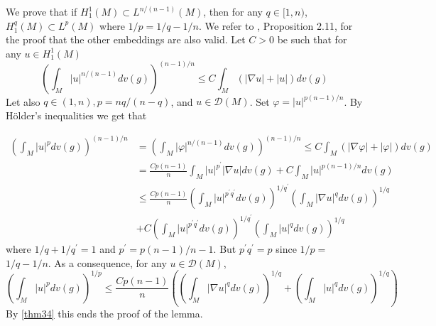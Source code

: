 \documentclass[12pt,hyperref,a4paper,UTF8]{ctexart}
\begin{document}
\begin{Proof}
    We prove that if $H_1^1(M) \subset L^{n /(n-1)}(M)$, then for any $q \in[1, n)$, $H_1^q(M) \subset L^p(M)$ where $1 / p=1 / q-1 / n$. We refer to \cite{Aubin}, Proposition 2.11, for the proof that the other embeddings are also valid. Let $C>0$ be such that for any $u \in H_1^{1}(M)$
$$
\left(\int_M|u|^{n /(n-1)} d v(g)\right)^{(n-1) / n} \leq C \int_M(|\nabla u|+|u|) d v(g)
$$
Let also $q \in(1, n), p=n q /(n-q)$, and $u \in \mathcal{D}(M)$. Set $\varphi=|u|^{p(n-1) / n}$. By Hölder's inequalities we get that

$$
\begin{aligned}
    \left(\int_M|u|^p d v(g)\right)^{(n-1) / n} &=\left(\int_M|\varphi|^{n /(n-1)} d v(g)\right)^{(n-1) / n} \leq C \int_M(|\nabla \varphi|+|\varphi|) d v(g)\\
    &= \frac{C p(n-1)}{n} \int_M|u|^{p^{\prime}}|\nabla u| d v(g)+C \int_M|u|^{p(n-1) / n} d v(g) \\
    &\leq  \frac{C p(n-1)}{n}\left(\int_M|u|^{p^{\prime} q^{\prime}} d v(g)\right)^{1 / q^{\prime}}\left(\int_M|\nabla u|^q d v(g)\right)^{1 / q} \\
    & +C\left(\int_M|u|^{p^{\prime} q^{\prime}} d v(g)\right)^{1 / q^{\prime}}\left(\int_M|u|^q d v(g)\right)^{1 / q}
\end{aligned}
$$
where $1 / q+1 / q^{\prime}=1$ and $p^{\prime}=p(n-1) / n-1$. But $p^{\prime} q^{\prime}=p$ since $1 / p=$ $1 / q-1 / n$. As a consequence, for any $u \in \mathcal{D}(M)$,
$$
\left(\int_M|u|^p d v(g)\right)^{1 / p} \leq \frac{C p(n-1)}{n}\left(\left(\int_M|\nabla u|^q d v(g)\right)^{1 / q}+\left(\int_M|u|^q d v(g)\right)^{1 / q}\right)
$$
By \autoref{thm34} this ends the proof of the lemma.
\end{Proof}
\end{document}
